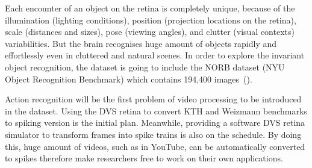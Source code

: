 Each encounter of an object on the retina is completely unique, because of the illumination (lighting conditions), position (projection locations on the retina), scale (distances and sizes), pose (viewing angles), and clutter (visual contexts) variabilities.
But the brain recognises huge amount of objects rapidly and effortlessly even in cluttered and natural scenes.
In order to explore the invariant object recognition, the dataset is going to include the NORB dataset (NYU Object Recognition Benchmark) which contains 194,400  images~(\cite{lecun2004learning}).

Action recognition will be the first problem of video processing to be introduced in the dataset.
Using the DVS retina to convert KTH and Weizmann benchmarks to spiking version is the initial plan.
Meanwhile, providing a software DVS retina simulator to transform  frames into spike trains is also on the schedule.
By doing this, huge amount of videos, such as in YouTube, can be automatically converted to spikes therefore make researchers free to work on their own applications.


